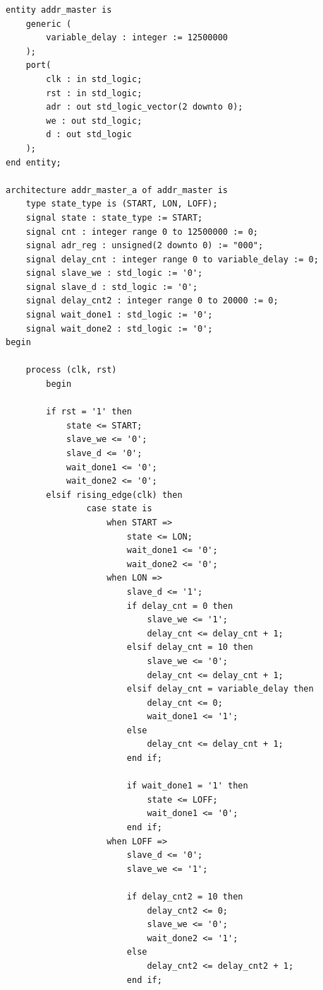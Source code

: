 \begin{verbatim}
entity addr_master is
    generic (
        variable_delay : integer := 12500000
    );
    port(
        clk : in std_logic;
        rst : in std_logic;
        adr : out std_logic_vector(2 downto 0);
        we : out std_logic;
        d : out std_logic
    );
end entity;

architecture addr_master_a of addr_master is
    type state_type is (START, LON, LOFF);
    signal state : state_type := START;
    signal cnt : integer range 0 to 12500000 := 0;
    signal adr_reg : unsigned(2 downto 0) := "000";
    signal delay_cnt : integer range 0 to variable_delay := 0;
    signal slave_we : std_logic := '0';
    signal slave_d : std_logic := '0';
    signal delay_cnt2 : integer range 0 to 20000 := 0;
    signal wait_done1 : std_logic := '0';
    signal wait_done2 : std_logic := '0';
begin
        
    process (clk, rst)
        begin

        if rst = '1' then
            state <= START;
            slave_we <= '0';
            slave_d <= '0';
            wait_done1 <= '0';
            wait_done2 <= '0';
        elsif rising_edge(clk) then
                case state is
                    when START =>
                        state <= LON;
                        wait_done1 <= '0';
                        wait_done2 <= '0';
                    when LON =>
                        slave_d <= '1';
                        if delay_cnt = 0 then
                            slave_we <= '1';
                            delay_cnt <= delay_cnt + 1;
                        elsif delay_cnt = 10 then
                            slave_we <= '0';
                            delay_cnt <= delay_cnt + 1;
                        elsif delay_cnt = variable_delay then
                            delay_cnt <= 0;
                            wait_done1 <= '1';
                        else
                            delay_cnt <= delay_cnt + 1;
                        end if;
                        
                        if wait_done1 = '1' then
                            state <= LOFF;
                            wait_done1 <= '0';
                        end if;
                    when LOFF =>
                        slave_d <= '0';
                        slave_we <= '1';
                        
                        if delay_cnt2 = 10 then
                            delay_cnt2 <= 0;
                            slave_we <= '0';
                            wait_done2 <= '1';
                        else
                            delay_cnt2 <= delay_cnt2 + 1;
                        end if; 
                        

\end{verbatim}
